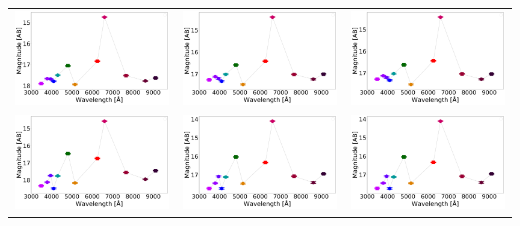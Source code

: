 \begin{table}
\begin{tabular}{ccc}
\includegraphics[width=0.3\linewidth, clip]{photopectrum_splus_MC0113-084466_aper.pdf} & \includegraphics[width=0.3\linewidth, clip]{photopectrum_splus_MC0113-084466_auto.pdf} & \includegraphics[width=0.3\linewidth, clip]{photopectrum_splus_MC0113-084466_petro.pdf} \\
\includegraphics[width=0.3\linewidth, clip]{photopectrum_splus_MC0114-113862_aper.pdf} & \includegraphics[width=0.3\linewidth, clip]{photopectrum_splus_MC0114-113862_auto.pdf} & \includegraphics[width=0.3\linewidth, clip]{photopectrum_splus_MC0114-113862_petro.pdf} \\

\end{tabular}
\end{table}
